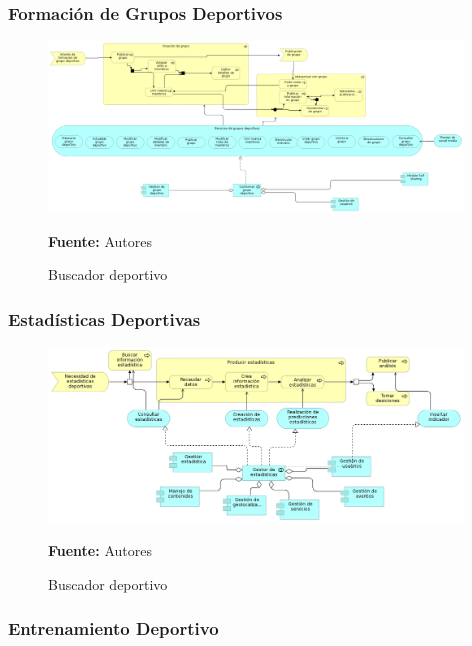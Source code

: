 \subsubsection{Formación de Grupos Deportivos}

\begin{figure}[!htb]
  \begin{center}
    \includegraphics[width=11cm]{./imagenes/application_usage/formaciongruposdeportivos.png}
    \caption{Buscador deportivo}
    \label{fig:BF_BuscadorDeportivo}
    \textbf{Fuente:}  Autores
  \end{center}
\end{figure}

\subsubsection{Estadísticas Deportivas}

\begin{figure}[!htb]
  \begin{center}
    \includegraphics[width=11cm]{./imagenes/application_usage/estadisticasdeportivas.png}
    \caption{Buscador deportivo}
    \label{fig:BF_BuscadorDeportivo}
    \textbf{Fuente:}  Autores
  \end{center}
\end{figure}

\subsubsection{Entrenamiento Deportivo}

